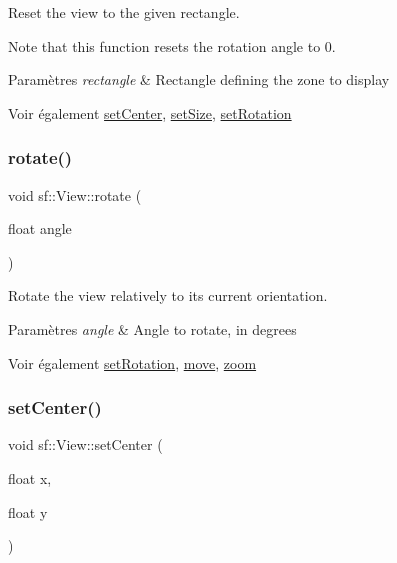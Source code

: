 Reset the view to the given rectangle. 

Note that this function resets the rotation angle to 0.


\begin{DoxyParams}{Paramètres}
{\em rectangle} & Rectangle defining the zone to display\\
\hline
\end{DoxyParams}
\begin{DoxySeeAlso}{Voir également}
\hyperlink{classsf_1_1View_aa8e3fedb008306ff9811163545fb75f2}{set\+Center}, \hyperlink{classsf_1_1View_a9525b73fe9fbaceb9568faf56b399dab}{set\+Size}, \hyperlink{classsf_1_1View_a24d0503c9c51f5ef5918612786d325c1}{set\+Rotation} 
\end{DoxySeeAlso}
\mbox{\label{classsf_1_1View_a5fd3901aae1845586ca40add94faa378}} 
\subsubsection{\texorpdfstring{rotate()}{rotate()}}
{\footnotesize\ttfamily void sf\+::\+View\+::rotate (\begin{DoxyParamCaption}\item[{float}]{angle }\end{DoxyParamCaption})}



Rotate the view relatively to its current orientation. 


\begin{DoxyParams}{Paramètres}
{\em angle} & Angle to rotate, in degrees\\
\hline
\end{DoxyParams}
\begin{DoxySeeAlso}{Voir également}
\hyperlink{classsf_1_1View_a24d0503c9c51f5ef5918612786d325c1}{set\+Rotation}, \hyperlink{classsf_1_1View_a0c82144b837caf812f7cb25a43d80c41}{move}, \hyperlink{classsf_1_1View_a4a72a360a5792fbe4e99cd6feaf7726e}{zoom} 
\end{DoxySeeAlso}
\mbox{\label{classsf_1_1View_aa8e3fedb008306ff9811163545fb75f2}} 
\subsubsection{\texorpdfstring{set\+Center()}{setCenter()}\hspace{0.1cm}{\footnotesize\ttfamily [1/2]}}
{\footnotesize\ttfamily void sf\+::\+View\+::set\+Center (\begin{DoxyParamCaption}\item[{float}]{x,  }\item[{float}]{y }\end{DoxyParamCaption})}



